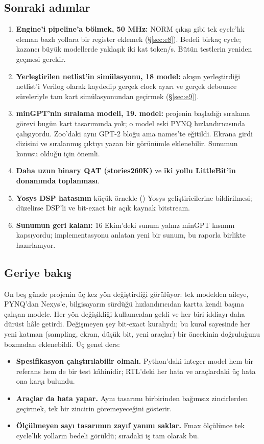 \subsection{Sonraki adımlar}
\begin{enumerate}
  \item \textbf{Engine'i pipeline'a bölmek, 50 MHz:} NORM çıkışı gibi tek cycle'lık eleman bazlı yollara bir register eklemek (§\ref{sec:e8}). Bedeli birkaç cycle; kazancı büyük modellerde yaklaşık iki kat token/s. Bütün testlerin yeniden geçmesi gerekir.
  \item \textbf{Yerleştirilen netlist'in simülasyonu, 18 model:} akışın yerleştirdiği netlist'i Verilog olarak kaydedip gerçek clock ayarı ve gerçek debounce süreleriyle tam kart simülasyonundan geçirmek (§\ref{sec:e9}).
  \item \textbf{minGPT'nin sıralama modeli, 19. model:} projenin başladığı  sıralama görevi bugün kart tasarımında yok; o model eski PYNQ hızlandırıcısında çalışıyordu. Zoo'daki  aynı GPT-2 bloğu ama names'te eğitildi. Ekrana girdi dizisini ve sıralanmış çıktıyı yazan bir görünümle eklenebilir. Sunumun konusu olduğu için önemli.
  \item \textbf{Daha uzun binary QAT (stories260K)} ve \textbf{iki yollu LittleBit'in donanımda toplanması}.
  \item \textbf{Yosys DSP hatasının} küçük örnekle () Yosys geliştiricilerine bildirilmesi; düzelirse DSP'li ve bit-exact bir açık kaynak bitstream.
  \item \textbf{Sunumun geri kalanı:} 16 Ekim'deki sunum yalnız minGPT kısmını kapsıyordu; implementasyonu anlatan yeni bir sunum, bu raporla birlikte hazırlanıyor.
\end{enumerate}

\subsection{Geriye bakış}

On beş günde projenin üç kez yön değiştirdiği görülüyor: tek modelden aileye, PYNQ'dan Nexys'e, bilgisayarın sürdüğü hızlandırıcıdan kartta kendi başına çalışan modele. Her yön değişikliği kullanıcıdan geldi ve her biri iddiayı daha dürüst hâle getirdi. Değişmeyen şey bit-exact kuralıydı; bu kural sayesinde her yeni katman (sampling, ekran, düşük bit, yeni araçlar) bir öncekinin doğruluğunu bozmadan eklenebildi. Üç genel ders:

\begin{itemize}
  \item \textbf{Spesifikasyon çalıştırılabilir olmalı.} Python'daki integer model hem bir referans hem de bir test kâhinidir; RTL'deki her hata ve araçlardaki üç hata ona karşı bulundu.
  \item \textbf{Araçlar da hata yapar.} Aynı tasarımı birbirinden bağımsız zincirlerden geçirmek, tek bir zincirin göremeyeceğini gösterir.
  \item \textbf{Ölçülmeyen sayı tasarımın zayıf yanını saklar.} Fmax ölçülünce tek cycle'lık yolların bedeli görüldü; sıradaki iş tam olarak bu.
\end{itemize}
